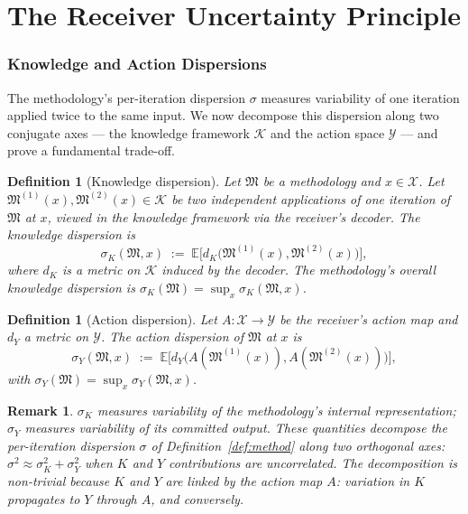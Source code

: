 \documentclass[twocolumn,11pt,a4paper]{article}
\newtheorem{definition}[theorem]{Definition}
\newtheorem{remark}[theorem]{Remark}
\newcommand{\Cands}{\mathcal{X}}
\newcommand{\Action}{\mathcal{Y}}
\newcommand{\Knowl}{\mathcal{K}}
\newcommand{\Method}{\mathfrak{M}}
\newcommand{\disp}{\sigma}
\begin{document}
\part{The Receiver Uncertainty Principle}

\section{Knowledge and Action Dispersions}
\label{sec:dispersions}

The methodology's per-iteration dispersion $\disp$ measures variability of one iteration applied twice to the same input. We now decompose this dispersion along two conjugate axes — the knowledge framework $\Knowl$ and the action space $\Action$ — and prove a fundamental trade-off.

\begin{definition}[Knowledge dispersion]
\label{def:dispK}
Let $\Method$ be a methodology and $x \in \Cands$. Let $\Method^{(1)}(x), \Method^{(2)}(x) \in \Knowl$ be two independent applications of one iteration of $\Method$ at $x$, viewed in the knowledge framework via the receiver's decoder. The \emph{knowledge dispersion} is
\[
\disp_K(\Method, x) \;:=\; \mathbb{E}\bigl[d_K\bigl(\Method^{(1)}(x), \Method^{(2)}(x)\bigr)\bigr],
\]
where $d_K$ is a metric on $\Knowl$ induced by the decoder. The methodology's overall knowledge dispersion is $\disp_K(\Method) = \sup_x \disp_K(\Method, x)$.
\end{definition}

\begin{definition}[Action dispersion]
\label{def:dispY}
Let $A : \Cands \to \Action$ be the receiver's action map and $d_Y$ a metric on $\Action$. The \emph{action dispersion} of $\Method$ at $x$ is
\[
\disp_Y(\Method, x) \;:=\; \mathbb{E}\bigl[d_Y\bigl(A(\Method^{(1)}(x)), A(\Method^{(2)}(x))\bigr)\bigr],
\]
with $\disp_Y(\Method) = \sup_x \disp_Y(\Method, x)$.
\end{definition}

\begin{remark}
\label{rem:disp-conjugate}
$\disp_K$ measures variability of the methodology's internal representation; $\disp_Y$ measures variability of its committed output. These quantities decompose the per-iteration dispersion $\disp$ of Definition~\ref{def:method} along two orthogonal axes: $\disp^2 \approx \disp_K^2 + \disp_Y^2$ when $K$ and $Y$ contributions are uncorrelated. The decomposition is non-trivial because $K$ and $Y$ are linked by the action map $A$: variation in $K$ propagates to $Y$ through $A$, and conversely.
\end{remark}
\end{document}
